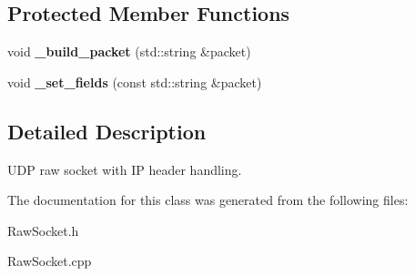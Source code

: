 \subsection*{Protected Member Functions}
\begin{CompactItemize}
\item 
\hypertarget{classsocketpp_1_1UDP__IP__RawSocket_16035f1b701b898f0e4de44a9ac8bbb3}{
void \textbf{\_\-build\_\-packet} (std::string \&packet)}
\label{classsocketpp_1_1UDP__IP__RawSocket_16035f1b701b898f0e4de44a9ac8bbb3}

\item 
\hypertarget{classsocketpp_1_1UDP__IP__RawSocket_40fde867fa138b495f660864023a3eb1}{
void \textbf{\_\-set\_\-fields} (const std::string \&packet)}
\label{classsocketpp_1_1UDP__IP__RawSocket_40fde867fa138b495f660864023a3eb1}

\end{CompactItemize}


\subsection{Detailed Description}
UDP raw socket with IP header handling. 

The documentation for this class was generated from the following files:\begin{CompactItemize}
\item 
RawSocket.h\item 
RawSocket.cpp\end{CompactItemize}
